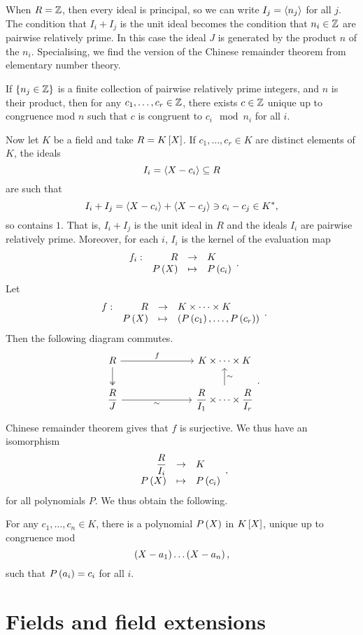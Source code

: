When $ R = \Z $, then every ideal is principal, so we can write $ I_j = \ab{n_j} $ for all $ j $. The condition that $ I_i + I_j $ is the unit ideal becomes the condition that $ n_i \in \Z $ are pairwise relatively prime. In this case the ideal $ J $ is generated by the product $ n $ of the $ n_i $. Specialising, we find the version of the Chinese remainder theorem from elementary number theory.

\begin{theorem}
If $ \cb{n_j \in \Z} $ is a finite collection of pairwise relatively prime integers, and $ n $ is their product, then for any $ c_1, \dots, c_r \in \Z $, there exists $ c \in \Z $ unique up to congruence mod $ n $ such that $ c $ is congruent to $ c_i \mod n_i $ for all $ i $.
\end{theorem}

Now let $ K $ be a field and take $ R = K\sb{X} $. If $ c_1, \dots, c_r \in K $ are distinct elements of $ K $, the ideals
$$ I_i = \ab{X - c_i} \subseteq R $$
are such that
$$ I_i + I_j = \ab{X - c_i} + \ab{X - c_j} \ni c_i - c_j \in K^*, $$
so contains $ 1 $. That is, $ I_i + I_j $ is the unit ideal in $ R $ and the ideals $ I_i $ are pairwise relatively prime. Moreover, for each $ i $, $ I_i $ is the kernel of the evaluation map
$$ \function[f_i]{R}{K}{P\rb{X}}{P\rb{c_i}}. $$
Let
$$ \function[f]{R}{K \times \dots \times K}{P\rb{X}}{\rb{P\rb{c_1}, \dots, P\rb{c_r}}}. $$
Then the following diagram commutes.
$$
\begin{tikzcd}[column sep=1in]
R \arrow{r}{f} \arrow[twoheadrightarrow]{d} & K \times \dots \times K \\
\dfrac{R}{J} \arrow[swap]{r}{\sim} & \dfrac{R}{I_1} \times \dots \times \dfrac{R}{I_r} \arrow[swap]{u}{\sim}
\end{tikzcd}.
$$
Chinese remainder theorem gives that $ f $ is surjective. We thus have an isomorphism
$$ \function{\dfrac{R}{I_i}}{K}{P\rb{X}}{P\rb{c_i}}, $$
for all polynomials $ P $. We thus obtain the following.

\begin{theorem}
For any $ c_1, \dots, c_n \in K $, there is a polynomial $ P\rb{X} $ in $ K\sb{X} $, unique up to congruence mod
$$ \rb{X - a_1} \dots \rb{X - a_n}, $$
such that $ P\rb{a_i} = c_i $ for all $ i $.
\end{theorem}

\pagebreak

\section{Fields and field extensions}

